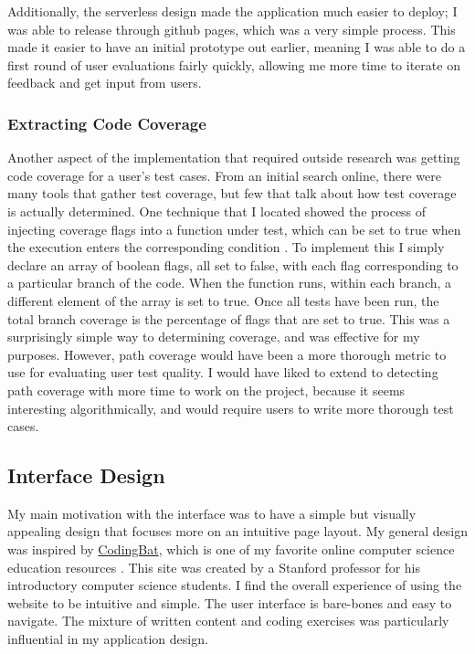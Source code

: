 \documentclass[10pt,twocolumn]{article}
\begin{document}
Additionally, the serverless design made the application much 
easier to deploy; I was able to release through github pages, which was a very simple process. This made 
it easier to have an initial prototype out earlier, meaning I was able to do a first round of user evaluations fairly quickly, 
allowing me more time to iterate on feedback and get input from users. 

\subsubsection{Extracting Code Coverage}

Another aspect of the implementation that required outside research was getting code coverage for a user's test cases.
From an initial search online, there were many tools that gather test coverage, but few that talk about how test coverage 
is actually determined. One technique that I located showed the process of injecting coverage flags into a function under 
test, which can be set to true when the execution enters the corresponding condition \cite{coverage}. To implement this I
simply declare an array of boolean flags, all set to false, with each flag corresponding to a particular branch of the code. When the function runs,
within each branch, a different element of the array is set to true. Once all tests have been run, the total branch coverage 
is the percentage of flags that are set to true. This was a surprisingly simple way to determining coverage, and was effective 
for my purposes. However, path coverage would have been a more thorough metric to use for evaluating user test quality. I 
would have liked to extend to detecting path coverage with more time to 
work on the project, because it seems interesting algorithmically, and would require users to write more thorough 
test cases.


\subsection{Interface Design}

My main motivation with the interface was to have a simple but visually appealing design that focuses more on an intuitive 
page layout. My general design was inspired by \href{https://codingbat.com/java}{CodingBat}, which is one 
of my favorite online computer science education resources \cite{CodingBat}. This site was created by a Stanford professor 
for his introductory computer science students. I find the overall experience of using the 
website to be intuitive and simple. The user interface is bare-bones and easy to navigate. The mixture 
of written content and coding exercises was particularly influential in my application design. 
\end{document}
